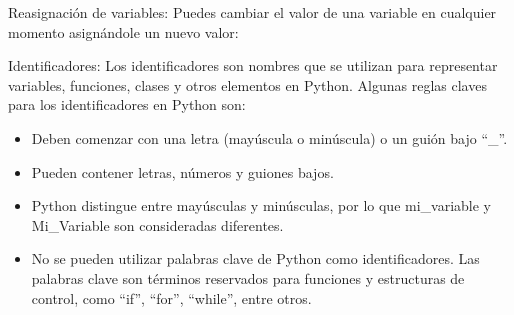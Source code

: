 Reasignación de variables: Puedes cambiar el valor de una variable en cualquier momento asignándole un nuevo valor:\\
\begin{figure}[h]
    \centering
  \end{figure}
\newpage
Identificadores: Los identificadores son nombres que se utilizan para representar variables, funciones, clases y otros elementos en Python. Algunas reglas claves para los identificadores en Python son:

\begin{itemize}
    \item Deben comenzar con una letra (mayúscula o minúscula) o un guión bajo ``\_''.
    \item Pueden contener letras, números y guiones bajos.
    \item Python distingue entre mayúsculas y minúsculas, por lo que mi\_variable y Mi\_Variable son consideradas diferentes.
    \item No se pueden utilizar palabras clave de Python como identificadores. Las palabras clave son términos reservados para funciones y estructuras de control, como ``if'', ``for'', ``while'', entre otros.
\end{itemize}

\begin{figure}[h]
    \centering
  \end{figure}

